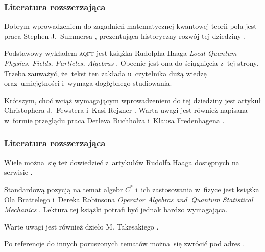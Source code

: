 \documentclass[10pt,t]{beamer}
\begin{document}
\begin{frame}
  \frametitle{Literatura rozszerzająca}


  Dobrym wprowadzeniem do zagadnień matematycznej kwantowej teorii
  pola jest praca Stephen J.~Summersa
  , prezentująca historyczny
  rozwój tej dziedziny
  \parencite{Summers-Prespective-on-Constructive-ETC-Ver-2016}.

  Podstawowy wykładem \textsc{aqft} jest książka Rudolpha Haaga
  \textit{Local Quantum Physics. Fields, Particles, Algebras}
  \parencite{Haag-Local-Quantum-Physics-Pub-1996}. Obecnie
  jest ona do ściągnięcia z~tej
  {strony}. Trzeba zauważyć, że~tekst ten zakłada u~czytelnika dużą wiedzę
  oraz~umiejętności i~wymaga dogłębnego studiowania.

  Krótszym, choć wciąż wymagającym wprowadzeniem do tej dziedziny
  jest artykuł Christophera J.~Fewstera i~Kasi Rejzner
  \parencite{Fewster-Rejzner-Algebraic-Quantum-Field-Theory-an-introduction-2019}. Warta uwagi jest również napisana w~formie przeglądu praca
  Detleva Buchholza i~Klausa Fredenhagena
  \parencite{Buchholz-Fredenhagen-Algebraic-quantum-field-theory-ETC-2023}.

\end{frame}





\begin{frame}
  \frametitle{Literatura rozszerzająca}


  Wiele można~się też dowiedzieć z~artykułów Rudolfa Haaga dostępnych
  na serwisie .

  Standardową pozycją na temat algebr $C^{ * }$ i~ich zastosowania
  w~fizyce jest książka Ola Brattelego i~Dereka Robinsona
  \textit{Operator Algebras and~Quantum Statistical Mechanics}
  \parencite{Bratteli-Robinson-Operator-algebras-ETC-Vol-I-Pub-2002}.
  Lektura tej książki potrafi być jednak bardzo wymagająca.

  Warte uwagi jest również dzieło M. Takesakiego
  .

  Po referencje do innych poruszonych tematów można~się zwrócić
  pod adres \email.

\end{frame}
\end{document}
